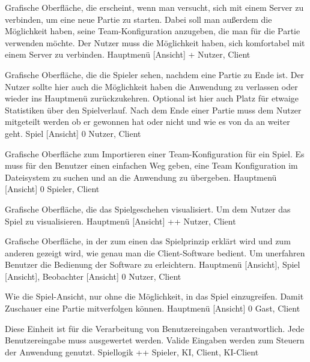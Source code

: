         {Grafische Oberfläche, die erscheint, wenn man versucht, sich mit einem Server zu verbinden, um eine neue Partie zu starten. Dabei soll man außerdem die Möglichkeit haben, seine Team-Konfiguration anzugeben, die man für die Partie verwenden möchte.}
        {Der Nutzer muss die Möglichkeit haben, sich komfortabel mit einem Server zu verbinden.}
        {Hauptmenü [Ansicht]}
        {+}
        {Nutzer, Client}

        {Grafische Oberfläche, die die Spieler sehen, nachdem eine Partie zu Ende ist. Der Nutzer sollte hier auch die Möglichkeit haben die Anwendung zu verlassen oder wieder ins Hauptmenü zurückzukehren. Optional ist hier auch Platz für etwaige Statistiken über den Spielverlauf.}
        {Nach dem Ende einer Partie muss dem Nutzer mitgeteilt werden ob er gewonnen hat oder nicht und wie es von da an weiter geht. }
        {Spiel [Ansicht]}
        {0}
        {Nutzer, Client}
        
        {Grafische Oberfläche zum Importieren einer Team-Konfiguration für ein Spiel.}
        {Es muss für den Benutzer einen einfachen Weg geben, eine Team Konfiguration im Dateisystem zu suchen und an die Anwendung zu übergeben.}
        {Hauptmenü [Ansicht]}
        {0}
        {Spieler, Client}
        
        {Grafische Oberfläche, die das Spielgeschehen visualisiert.}
        {Um dem Nutzer das Spiel zu visualisieren.}
        {Hauptmenü [Ansicht]}
        {++}
        {Nutzer, Client}	
        
        {Grafische Oberfläche, in der zum einen das Spielprinzip erklärt wird und zum anderen gezeigt wird, wie genau man die Client-Software bedient.}
        {Um unerfahren Benutzer die Bedienung der Software zu erleichtern.}
        {Hauptmenü [Ansicht], Spiel [Ansicht], Beobachter [Ansicht]}
        {0}
        {Nutzer, Client}
        
        {Wie die Spiel-Ansicht, nur ohne die Möglichkeit, in das Spiel einzugreifen.}
        {Damit Zuschauer eine Partie mitverfolgen können.}
        {Hauptmenü [Ansicht]}
        {0}
        {Gast, Client}

        {Diese Einheit ist für die Verarbeitung von Benutzereingaben verantwortlich.}
        {Jede Benutzereingabe muss ausgewertet werden. Valide Eingaben werden zum Steuern der Anwendung genutzt.}
        {Spiellogik}
        {++}
        {Spieler, KI, Client, KI-Client}
        
